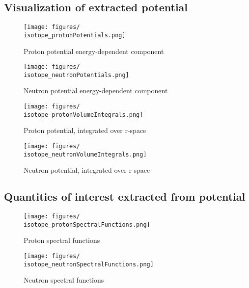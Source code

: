 {    \afterpage{\clearpage}

    \subsection{Visualization of extracted potential}

    \begin{figure}[H]
        \centering
        \begin{minipage}{0.5\textwidth}
            \centering
            \texttt{[image: figures/\\isotope\_protonPotentials.png]}
            \caption{Proton potential energy-dependent component}
        \end{minipage}\hfill
        \begin{minipage}{0.5\textwidth}
            \centering
            \texttt{[image: figures/\\isotope\_neutronPotentials.png]}
            \caption{Neutron potential energy-dependent component}
        \end{minipage}
    \end{figure}

    \begin{figure}[H]
        \centering
        \begin{minipage}{0.5\textwidth}
            \centering
            \texttt{[image: figures/\\isotope\_protonVolumeIntegrals.png]}
            \caption{Proton potential, integrated over r-space}
        \end{minipage}\hfill
        \begin{minipage}{0.5\textwidth}
            \centering
            \texttt{[image: figures/\\isotope\_neutronVolumeIntegrals.png]}
            \caption{Neutron potential, integrated over r-space}
        \end{minipage}
    \end{figure}

    \afterpage{\clearpage}

    \subsection{Quantities of interest extracted from potential}

    \begin{figure}[H]
        \centering
        \begin{minipage}{0.5\textwidth}
            \centering
            \texttt{[image: figures/\\isotope\_protonSpectralFunctions.png]}
            \caption{Proton spectral functions}
        \end{minipage}\hfill
        \begin{minipage}{0.5\textwidth}
            \centering
            \texttt{[image: figures/\\isotope\_neutronSpectralFunctions.png]}
            \caption{Neutron spectral functions}
        \end{minipage}
    \end{figure}

}
